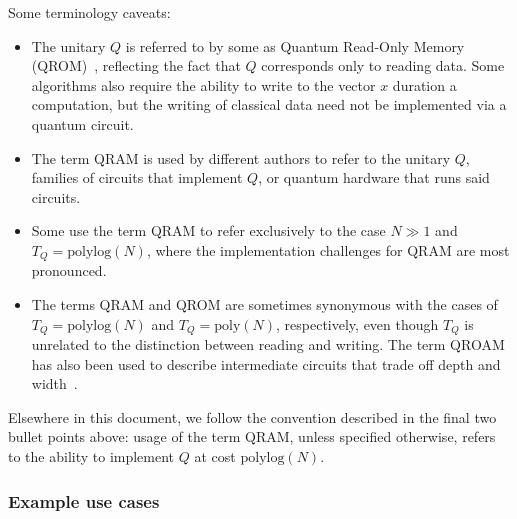 \begin{refsection}
Some terminology caveats:
\begin{itemize}
    \item The unitary $Q$ is referred to by some as Quantum Read-Only Memory (QROM)~\cite{babbush2018EncodingElectronicSpectraLinearT}, reflecting the fact that $Q$ corresponds only to reading data. Some algorithms also require the ability to write to the vector $x$ duration a computation, but the writing of classical data need not be implemented via a quantum circuit.
    \item The term QRAM is used by different authors to refer to the unitary $Q$, families of circuits that implement $Q$, or quantum hardware that runs said circuits. 
    \item Some use the term QRAM to refer exclusively to the case $N\gg 1$ and $T_Q = \mathrm{polylog} (N)$, where the implementation challenges for QRAM are most pronounced. 
    \item The terms QRAM and QROM are sometimes synonymous with the cases of $T_Q = \mathrm{polylog}(N)$ and $T_Q = \mathrm{poly}(N)$, respectively, even though $T_Q$ is unrelated to the distinction between reading and writing. The term QROAM has also been used to describe intermediate circuits that trade off depth and width~\cite{Berry2019QubitizationOfArbitraryBasisChemistry}.
\end{itemize} 
Elsewhere in this document, we follow the convention described in the final two bullet points above: usage of the term QRAM, unless specified otherwise, refers to the ability to implement $Q$ at cost $\mathrm{polylog}(N)$. 


\subsubsection*{Example use cases}


\end{refsection}
